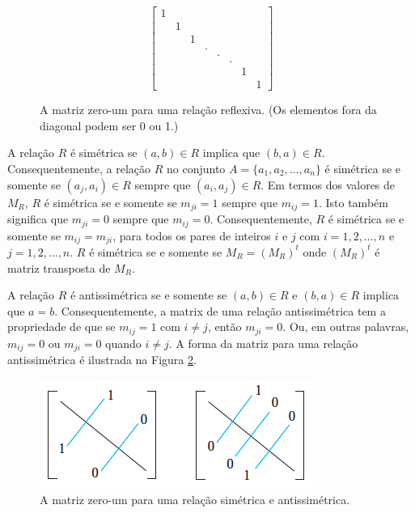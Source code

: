 \begin{figure}[H]
	\centering
	\[
	\begin{bmatrix}
	 1	& 	& 	&	&	&	&	&\\
	 	& 1 &	&	&	&	&	&\\
		&	& 1 &	&	&	&	&\\
		&	&  	& .	&	&	&	&\\
		&	&	& 	& . &	&	&\\
		&	&	&	&	& . &	&\\
		&	&	& 	&	&	& 1	&\\
		&	&	&	&	&	&	& 1 
	\end{bmatrix}
	\]
	\caption{A matriz zero-um para uma relação reflexiva. (Os elementos fora da diagonal podem ser 0 ou 1.)}
	\label{Figura61}
\end{figure}

A relação $R$ é simétrica se $(a,b) \in R$ implica que $(b, a) \in R$.
Consequentemente, a relação $R$ no conjunto $A = \{a_1, a_2, \ldots, a_n\}$ é
simétrica se e somente se $(a_j, a_i) \in R$ sempre que $(a_i, a_j) \in R$. Em
termos dos valores de $M_R$, $R$ é simétrica se e somente se $m_{ji} = 1$
sempre que $m_{ij} = 1$. Isto também significa que $m_{ji} = 0$ sempre que
$m_{ij} = 0$. Consequentemente, $R$ é simétrica se e somente se $m_{ij} =
m_{ji}$, para todos os pares de inteiros $i$ e $j$ com $i = 1,2,\ldots,n$ e
$j=1,2,\ldots,n$. $R$ é simétrica se e somente se $M_R = (M_R)^t$ onde
$(M_R)^t$ é matriz transposta de $M_R$.

A relação $R$ é antissimétrica se e somente se $(a, b) \in R$ e $(b, a) \in R$
implica que $a = b$. Consequentemente, a matrix de uma relação antissimétrica
tem a propriedade de que se $m_{ij} = 1$ com $i \ne j$, então $m_{ji} = 0$.
Ou, em outras palavras, $m_{ij} =0$ ou $m_{ji} =0$ quando $i \ne j$. A forma da
matriz para uma relação antissimétrica é ilustrada na Figura \ref{Figura62}.

\begin{figure}[H]
	\centering
	\includegraphics[scale=0.6]{chapter/imagens/62}
	\caption{A matriz zero-um para uma relação simétrica e antissimétrica.}
	\label{Figura62}
\end{figure}

